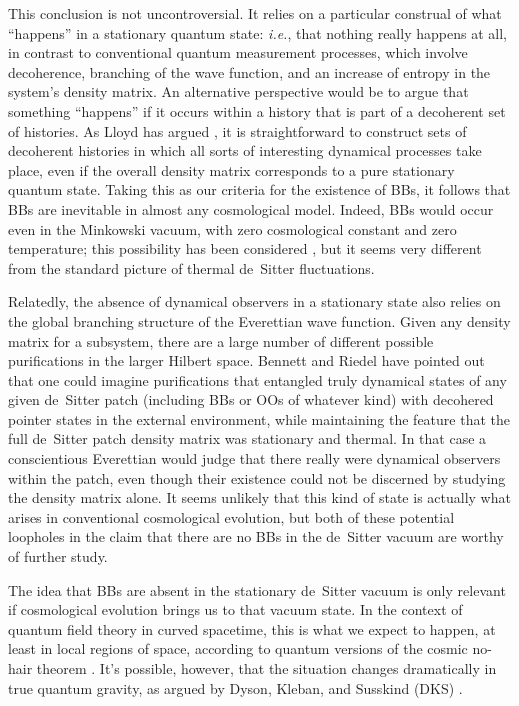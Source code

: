 \documentclass[12pt,letterpaper]{article}
\begin{document}
This conclusion is not uncontroversial.
It relies on a particular construal of what ``happens'' in a stationary quantum state: {\it i.e.}, that nothing really happens at all, in contrast to conventional quantum measurement processes, which involve decoherence, branching of the wave function, and an increase of entropy in the system's density matrix.
An alternative perspective would be to argue that something ``happens'' if it occurs within a history that is part of a decoherent set of histories.
As Lloyd has argued \cite{Lloyd:2016ahu}, it is straightforward to construct sets of decoherent histories in which all sorts of interesting dynamical processes take place, even if the overall density matrix corresponds to a pure stationary quantum state.
Taking this as our criteria for the existence of BBs, it follows that BBs are inevitable in almost any cosmological model.
Indeed, BBs would occur even in the Minkowski vacuum, with zero cosmological constant and zero temperature; this possibility has been considered \cite{Page:2005ur,Page:2006dt,Davenport:2010jy,Nomura:2015zda}, but it seems very different from the standard picture of thermal de~Sitter fluctuations.

Relatedly, the absence of dynamical observers in a stationary state also relies on the global branching structure of the Everettian wave function.
Given any density matrix for a subsystem, there are a large number of different possible purifications in the larger Hilbert space.
Bennett and Riedel \cite{bennettriedel} have pointed out that one could imagine purifications that entangled truly dynamical states of any given de~Sitter patch (including BBs or OOs of whatever kind) with decohered pointer states in the external environment, while maintaining the feature that the full de~Sitter patch density matrix was stationary and thermal.
In that case a conscientious Everettian would judge that there really were dynamical observers within the patch, even though their existence could not be discerned by studying the density matrix alone.
It seems unlikely that this kind of state is actually what arises in conventional cosmological evolution, but both of these potential loopholes in the claim that there are no BBs in the de~Sitter vacuum are worthy of further study.

The idea that BBs are absent in the stationary de~Sitter vacuum is only relevant if cosmological evolution brings us to that vacuum state.
In the context of quantum field theory in curved spacetime, this is what we expect to happen, at least in local regions of space, according to quantum versions of the cosmic no-hair theorem \cite{Marolf:2010nz,Hollands:2010pr}.
It's possible, however, that the situation changes dramatically in true quantum gravity, as argued by Dyson, Kleban, and Susskind (DKS) \cite{Dyson:2002pf}.
\end{document}
